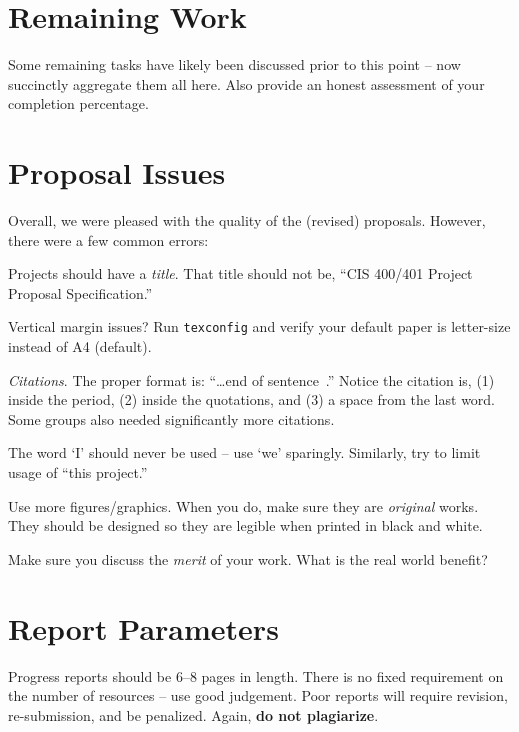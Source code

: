 \documentclass{sig-alternate}
\begin{document}
\section{Remaining Work}
\label{sec:remaining_work}
Some remaining tasks have likely been discussed prior to this point -- now succinctly aggregate them all here. Also provide an honest assessment of your completion percentage.



\appendix
\section{Proposal Issues}
\label{app:prop_issues}
Overall, we were pleased with the quality of the (revised) proposals. However, there were a few common errors:

\begin{itemize*}
  \item Projects should have a \textit{title}. That title should not be, ``CIS 400/401 Project Proposal Specification.''
  \item Vertical margin issues? Run \texttt{texconfig} and verify your default paper is letter-size instead of A4 (default).
  \item \textit{Citations}. The proper format is: ``\ldots end of sentence~\cite{latex_wikibook}.'' Notice the citation is, (1) inside the period, (2) inside the quotations, and (3) a space from the last word. Some groups also needed significantly more citations.
  \item The word `I' should never be used -- use `we' sparingly. Similarly, try to limit usage of ``this project.''
  \item Use more figures/graphics. When you do, make sure they are \textit{original} works. They should be designed so they are legible when printed in black and white.
	\item Make sure you discuss the \textit{merit} of your work. What is the real world benefit?
\end{itemize*}


\section{Report Parameters}
\label{app:report_params}
Progress reports should be $6$--$8$ pages in length. There is no fixed requirement on the number of resources -- use good judgement. Poor reports will require revision, re-submission, and be penalized. Again, \textbf{do not plagiarize}.
\end{document}
